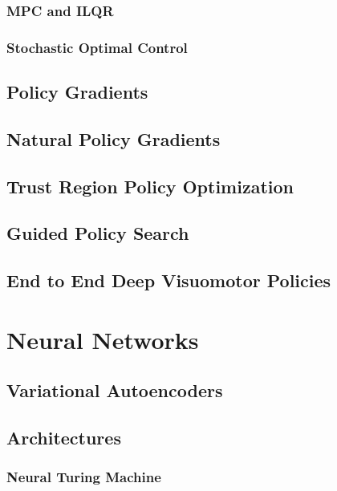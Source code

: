 \documentclass[12pt]{article}
\begin{document}
\subsubsection{MPC and ILQR}

\subsubsection{Stochastic Optimal Control}

\subsection{Policy Gradients}

\subsection{Natural Policy Gradients}

\subsection{Trust Region Policy Optimization}

\subsection{Guided Policy Search}

\subsection{End to End Deep Visuomotor Policies}

\section{Neural Networks}

\subsection{Variational Autoencoders}

\subsection{Architectures}

\subsubsection{Neural Turing Machine}
\end{document}
